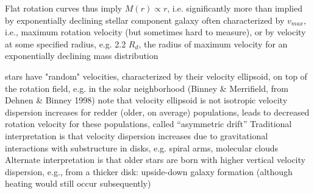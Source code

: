 \documentclass{article}
\begin{document}
    Flat rotation curves thus imply  $M(r) \propto r$, i.e. significantly
    more than implied by exponentially declining stellar component
    galaxy often characterized by $v_{max}$, i.e., maximum rotation
    velocity (but sometimes hard to measure), or by velocity at some
    specified radius, e.g. 2.2 $R_d$, the radius of maximum velocity for an
    exponentially declining mass distribution

    stars have "random" velocities, characterized by their velocity
    ellipsoid, on top of the rotation field, e.g. in the solar neighborhood
    (Binney \& Merrifield, from Dehnen \& Binney 1998)
    note that velocity ellipsoid is not isotropic
    velocity dispersion increases for redder (older, on average)
    populations, leads to decreased rotation velocity for these
    populations, called ``asymmetric drift''
    Traditional interpretation is that velocity dispersion increases due to
    gravitational interactions with substructure in disks, e.g. spiral
    arms, molecular clouds
    Alternate interpretation is that older stars are born with higher
    vertical velocity dispersion, e.g., from a thicker disk: upside-down
    galaxy formation (although heating would still occur subsequently)
\end{document}
